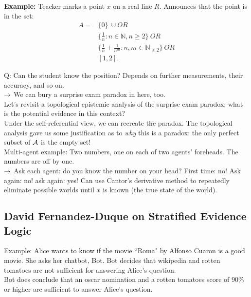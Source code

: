 {\bf Example:} Teacker marks a point $x$ on a real line $R$. Announces that the point is in the set:
\begin{align}
A = &\{0\}\ \cup OR\\
&\{\frac{1}{n} : n \in \mathbb{N}, n \geq 2\}\ OR \\ &\{\frac{1}{n} + \frac{1}{n^m} : n,m \in \mathbb{N}_{\geq 2}\}\ OR\\
&[1,2].
\end{align}

Q: Can the student know the position? Depends on further measurements, their accuracy, and so on. \\

$\rightarrow$ We can bury a surprise exam paradox in here, too. \\

Let's revisit a topological epistemic analysis of the surprise exam paradox: what is the potential evidence in this context? \\

Under the self-referential view, we can recreate the paradox. The topological analysis gave us some justification as to {\it why} this is a paradox: the only perfect subset of $\mathcal{A}$ is the empty set! \\

Multi-agent example: Two numbers, one on each of two agents' foreheads. The numbers are off by one. \\

$\rightarrow$ Ask each agent: do you know the number on your head? First time: no! Ask again: no! ask again: yes! Can use Cantor's derivative method to repeatedly eliminate possible worlds until $x$ is known (the true state of the world).
\spacerule





\subsection{David Fernandez-Duque on Stratified Evidence Logic}

Example: Alice wants to know if the movie ``Roma" by Alfonso Cuaron is a good movie. She asks her chatbot, Bot. Bot decides that wikipedia and rotten tomatoes are not sufficient for answering Alice's question. \\

Bot does conclude that an oscar nomination and a rotten tomatoes score of 90\% or higher are sufficient to answer Alice's question. \\

